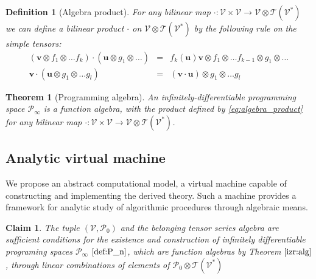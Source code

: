\documentclass[smallcondensed]{svjour3}
\newcommand{\T}{\mathcal{T}}
\newcommand{\VV}{\mathcal{V}}
\newcommand{\uu}{\mathbf{u}}
\newcommand{\vv}{\mathbf{v}}
\newcommand{\dP}{\mathcal{P}}
\newtheorem{definicija}{Definition}[section]
\newtheorem{trditev}{Claim}[section]
\newtheorem{izrek}{Theorem}[section]
\begin{document}
 

\begin{definicija}[Algebra product]
 For any bilinear map $\cdot :\VV\times \VV\to \VV\otimes \T(\VV^*)$ we can define a
 bilinear product $\cdot$ on $\VV\otimes \T(\VV^*)$ by the following rule on the simple
 tensors:
 \begin{eqnarray}
   \label{eq:algebra_product}
   (\vv\otimes f_1\otimes\ldots f_k) \cdot (\uu\otimes g_1\otimes\ldots) &=& 
f_k(\uu)\vv\otimes f_1\otimes\ldots f_{k-1}\otimes g_1\otimes\ldots \\
   \vv\cdot (\uu\otimes g_1\otimes\ldots g_l) &=&  (\vv\cdot \uu)\otimes
    \nonumber                                              g_1\otimes\ldots g_l
 \end{eqnarray}
\end{definicija}
\begin{izrek}[Programming algebra]\label{izr:alg}
An infinitely-differentiable programming space $\dP_\infty$ is a function algebra,
with the product defined by \eqref{eq:algebra_product} for any bilinear map $\cdot :\VV\times \VV\to \VV\otimes \T(\VV^*)$.
\end{izrek}

\subsection{Analytic virtual machine}

We propose an abstract computational model, a virtual machine capable of constructing and implementing the derived theory. Such a machine provides a framework for analytic study of algorithmic procedures through algebraic means.

\begin{trditev}
The tuple  $(\VV,\dP_0)$ and the belonging \emph{tensor series algebra} are sufficient conditions for the existence and construction of \emph{infinitely differentiable programing spaces} $\dP_\infty$ $\eqref{def:P_n}$, which are \emph{function algebras} by Theorem $\ref{izr:alg}$, through linear combinations of elements of $\dP_0\otimes \T(\VV^*)$
\end{trditev}
\end{document}
